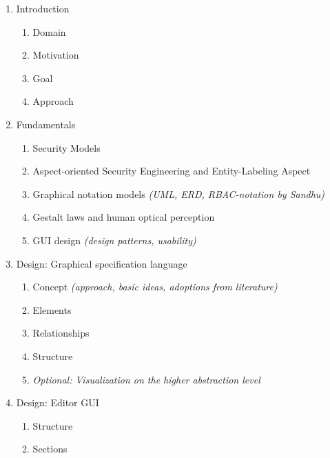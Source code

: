 \documentclass[12pt,a4paper]{article}
\newenvironment{redtext}{\color{gray} \it{}}{\ignorespacesafterend}
\begin{document}
   \begin{enumerate}[noitemsep]
      \item Introduction
  \begin{enumerate}[noitemsep]
         \item Domain
         \item Motivation
         \item Goal
         \item Approach
      \end{enumerate}
      \item Fundamentals
  \begin{enumerate}[noitemsep]
         \item Security Models
         \item Aspect-oriented Security Engineering and Entity-Labeling Aspect
         \item Graphical notation models \begin{redtext}(UML, ERD, RBAC-notation by Sandhu)\end{redtext}
         \item Gestalt laws and human optical perception
         \item GUI design \begin{redtext}(design patterns, usability)\end{redtext}
      \end{enumerate}
      \item Design: Graphical specification language
  \begin{enumerate}[noitemsep]
         \item Concept \begin{redtext}(approach, basic ideas, adoptions from literature)\end{redtext}
         \item Elements
         \item Relationships
         \item Structure
	  \item \begin{redtext}Optional: Visualization on the higher abstraction level\end{redtext}
      \end{enumerate}
      \item Design: Editor GUI
  \begin{enumerate}[noitemsep]
         \item Structure
         \item Sections
      \end{enumerate}

\end{enumerate}
\end{document}

